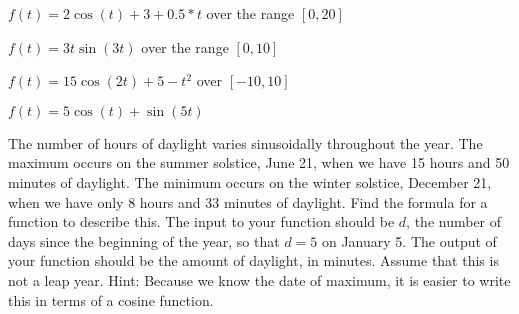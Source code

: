 \begin{exercises}
\begin{center}
    \end{center}
\begin{exerciseSolution}
    \ba
        \item $f(t) = 2\cos(t) + 3 + 0.5*t$ over the range $[0,20]$
        \item $f(t) = 3t \sin(3t)$ over the range $[0,10]$
        \item $f(t) = 15\cos(2t) + 5-t^2$ over $[-10,10]$
        \item $f(t) = 5\cos(t) + \sin(5t)$
    \ea
\end{exerciseSolution}


\item The number of hours of daylight varies sinusoidally throughout the year.  The
    maximum occurs on the summer solstice, June 21, when we have 15 hours and 50 minutes
    of daylight.  The minimum occurs on the winter solstice, December 21, when we have
    only 8 hours and 33 minutes of daylight.  Find the formula for a function to describe
    this.  The input to your function should be $d$, the number of days since the
    beginning of the year, so that $d = 5$ on January 5.  The output of your function
    should be the amount of daylight, in minutes.  Assume that this is not a leap year.
    Hint:  Because we know the date of maximum, it is easier to write this in terms of a
    cosine function.

\begin{exerciseSolution}
\end{exerciseSolution}



\end{exercises}
\afterexercises
